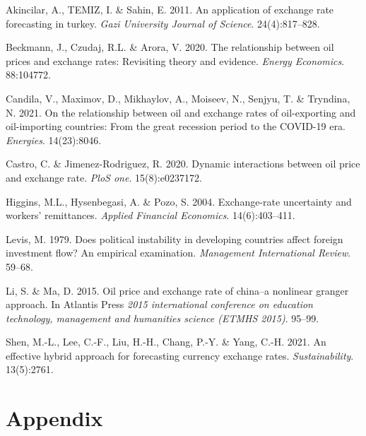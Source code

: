 \documentclass[11pt,preprint, authoryear]{elsarticle}
\numberwithin{equation}{section}
\numberwithin{figure}{section}
\numberwithin{table}{section}
\newlength{\cslhangindent}
\newenvironment{CSLReferences}%
  {\setlength{\parindent}{0pt}%
  \everypar{\setlength{\hangindent}{\cslhangindent}}\ignorespaces}%
  {\par}
\begin{document}
\hypertarget{refs}{}
\begin{CSLReferences}{1}{0}
\leavevmode{}%
Akincilar, A., TEMIZ, I. \& Sahin, E. 2011. An application of exchange
rate forecasting in turkey. \emph{Gazi University Journal of Science}.
24(4):817--828.

\leavevmode{}%
Beckmann, J., Czudaj, R.L. \& Arora, V. 2020. The relationship between
oil prices and exchange rates: Revisiting theory and evidence.
\emph{Energy Economics}. 88:104772.

\leavevmode{}%
Candila, V., Maximov, D., Mikhaylov, A., Moiseev, N., Senjyu, T. \&
Tryndina, N. 2021. On the relationship between oil and exchange rates of
oil-exporting and oil-importing countries: From the great recession
period to the COVID-19 era. \emph{Energies}. 14(23):8046.

\leavevmode{}%
Castro, C. \& Jimenez-Rodriguez, R. 2020. Dynamic interactions between
oil price and exchange rate. \emph{PloS one}. 15(8):e0237172.

\leavevmode{}%
Higgins, M.L., Hysenbegasi, A. \& Pozo, S. 2004. Exchange-rate
uncertainty and workers' remittances. \emph{Applied Financial
Economics}. 14(6):403--411.

\leavevmode{}%
Levis, M. 1979. Does political instability in developing countries
affect foreign investment flow? An empirical examination.
\emph{Management International Review}. 59--68.

\leavevmode{}%
Li, S. \& Ma, D. 2015. Oil price and exchange rate of china--a nonlinear
granger approach. In Atlantis Press \emph{2015 international conference
on education technology, management and humanities science (ETMHS
2015)}. 95--99.

\leavevmode{}%
Shen, M.-L., Lee, C.-F., Liu, H.-H., Chang, P.-Y. \& Yang, C.-H. 2021.
An effective hybrid approach for forecasting currency exchange rates.
\emph{Sustainability}. 13(5):2761.

\end{CSLReferences}

\hypertarget{appendix}{%
\section*{Appendix}\label{appendix}}
\end{document}

